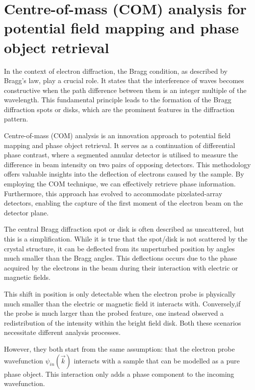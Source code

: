 
\chapter{Centre-of-mass (COM) analysis for potential field mapping and phase object retrieval}
\label{sec:COM}
%
In the context of electron diffraction, the Bragg condition, as described by Bragg's law, play a crucial role. It states that the interference of waves becomes constructive when the path difference between them is an integer multiple of the wavelength. This fundamental principle leads to the formation of the Bragg diffraction spots or disks, which are the prominent features in the diffraction pattern.

Centre-of-mass (COM) analysis is an innovation approach to potential field mapping and phase object retrieval. 
%
It serves as a continuation of differential phase contrast, where a segmented annular detector is utilised to measure the difference in beam intensity on two pairs of opposing detectors. 
%
This methodology offers valuable insights into the deflection of electrons caused by the sample. 
%
By employing the COM technique, we can effectively  retrieve phase information. 
%
Furthermore, this approach has evolved to accommodate pixelated-array detectors, enabling the capture of the first moment of the electron beam on the detector plane. 

The central Bragg diffraction spot or disk is often described as unscattered, but this is a simplification. 
%
While it is true that the spot/disk is not scattered by the crystal structure, it can be deflected from its  unperturbed position by angles much smaller than the Bragg angles. 
%
This deflections occurs due to the phase acquired by the electrons in the beam during their interaction with electric or magnetic fields.

This shift in position is only detectable when the electron probe is physically much smaller than the electric or magnetic field it interacts with.
%
Conversely,if the probe is much larger than the probed feature, one instead observed a redistribution of the intensity within the bright field disk.
%
Both these scenarios necessitate different analysis processes.

However, they both start from the same assumption: that the electron probe wavefunction $\psi_{in}(\vec{k})$ interacts with a sample that can be modelled as a pure phase object. This interaction only adds a phase component to the incoming wavefunction\cite{caoTheoryPracticeElectron2018, lazicPhaseContrastSTEM2016}. 

